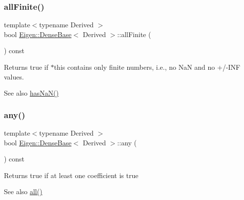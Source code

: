 \subsubsection{\texorpdfstring{allFinite()}{allFinite()}}
{\footnotesize\ttfamily template$<$typename Derived $>$ \\
bool \mbox{\hyperlink{class_eigen_1_1_dense_base}{Eigen\+::\+Dense\+Base}}$<$ Derived $>$\+::all\+Finite (\begin{DoxyParamCaption}{ }\end{DoxyParamCaption}) const\hspace{0.3cm}{\ttfamily [inline]}}

\begin{DoxyReturn}{Returns}
true if {\ttfamily $\ast$this} contains only finite numbers, i.\+e., no NaN and no +/-\/\+I\+NF values.
\end{DoxyReturn}
\begin{DoxySeeAlso}{See also}
\mbox{\hyperlink{class_eigen_1_1_dense_base_ab13d158c900560d3e1b25d85d2d33dd6}{has\+Na\+N()}} 
\end{DoxySeeAlso}
\mbox{\label{class_eigen_1_1_dense_base_abfbf4cb72dd577e62fbe035b1c53e695}} 
\subsubsection{\texorpdfstring{any()}{any()}}
{\footnotesize\ttfamily template$<$typename Derived $>$ \\
bool \mbox{\hyperlink{class_eigen_1_1_dense_base}{Eigen\+::\+Dense\+Base}}$<$ Derived $>$\+::any (\begin{DoxyParamCaption}{ }\end{DoxyParamCaption}) const\hspace{0.3cm}{\ttfamily [inline]}}

\begin{DoxyReturn}{Returns}
true if at least one coefficient is true
\end{DoxyReturn}
\begin{DoxySeeAlso}{See also}
\mbox{\hyperlink{class_eigen_1_1_dense_base_ae42ab60296c120e9f45ce3b44e1761a4}{all()}} 
\end{DoxySeeAlso}
\mbox{\label{class_eigen_1_1_dense_base_ab8e42e67c5cfd5fa13e684642f0f65bf}} 
